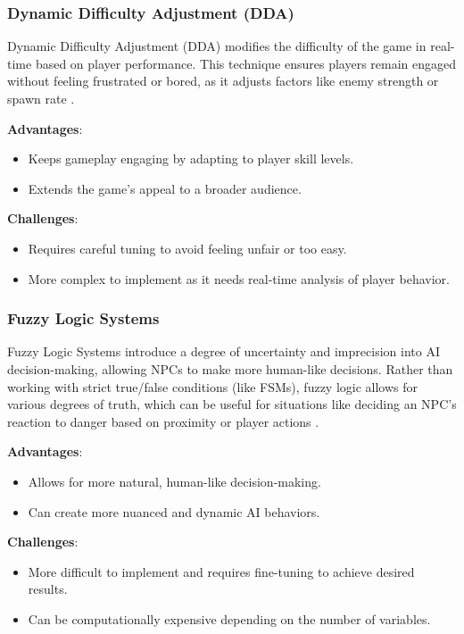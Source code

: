 \subsubsection{Dynamic Difficulty Adjustment (DDA)}

Dynamic Difficulty Adjustment (DDA) modifies the difficulty of the game in real-time based on player performance.
This technique ensures players remain engaged without feeling frustrated or bored,
as it adjusts factors like enemy strength or spawn rate \cite{Zohaib_2018}.

\textbf{Advantages}:
\begin{itemize}
    \item Keeps gameplay engaging by adapting to player skill levels.
    \item Extends the game's appeal to a broader audience.
\end{itemize}

\textbf{Challenges}:
\begin{itemize}
    \item Requires careful tuning to avoid feeling unfair or too easy.
    \item More complex to implement as it needs real-time analysis of player behavior.
\end{itemize}

\subsubsection{Fuzzy Logic Systems}

Fuzzy Logic Systems introduce a degree of uncertainty and imprecision into AI decision-making,
allowing NPCs to make more human-like decisions.
Rather than working with strict true/false conditions (like FSMs),
fuzzy logic allows for various degrees of truth,
which can be useful for situations like deciding an NPC's reaction to danger based on proximity or player actions \cite{Pirovano_2012}.

\textbf{Advantages}:
\begin{itemize}
    \item Allows for more natural, human-like decision-making.
    \item Can create more nuanced and dynamic AI behaviors.
\end{itemize}

\textbf{Challenges}:
\begin{itemize}
    \item More difficult to implement and requires fine-tuning to achieve desired results.
    \item Can be computationally expensive depending on the number of variables.
\end{itemize}

